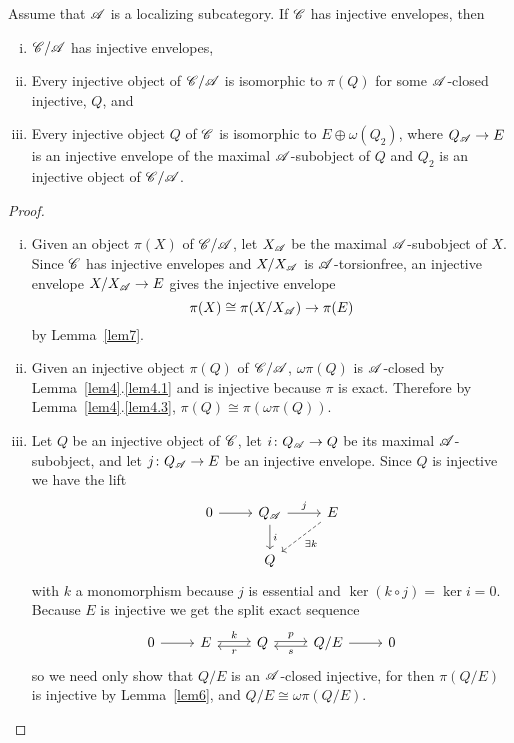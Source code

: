 \documentclass[10pt]{amsart}
\begin{document}
\begin{prop}\label{prop1}
  Assume that $\mathscr{A}$ is a localizing subcategory.
  If $\mathscr{C}$ has injective envelopes, then
  \begin{enumerate}[(i)]
  \item
    $\mathscr{C}/\mathscr{A}$ has injective envelopes,
  \item
    Every injective object of $\mathscr{C}/\mathscr{A}$ is isomorphic to $\pi(Q)$ for some $\mathscr{A}$-closed injective, $Q$, and
  \item
    Every injective object $Q$ of $\mathscr{C}$ is isomorphic to $E \oplus \omega(Q_2)$, where $Q_{\mathscr{A}} \rightarrow E$ is an injective envelope of the maximal $\mathscr{A}$-subobject of $Q$ and $Q_2$ is an injective object of $\mathscr{C}/\mathscr{A}$.
  \end{enumerate}
  
  \begin{proof}
    \begin{enumerate}[(i)]
    \item
      Given an object $\pi(X)$ of $\mathscr{C}/\mathscr{A}$, let $X_{\mathscr{A}}$ be the maximal $\mathscr{A}$-subobject of $X$.
      Since $\mathscr{C}$ has injective envelopes and $X/X_{\mathscr{A}}$ is $\mathscr{A}$-torsionfree, an injective envelope $X/X_{\mathscr{A}} \rightarrow E$ gives the injective envelope
      $$\pi(X) \cong \pi(X/X_{\mathscr{A}}) \rightarrow \pi(E)$$
      by Lemma~\ref{lem7}.
    \item
      Given an injective object $\pi(Q)$ of $\mathscr{C}/\mathscr{A}$, $\omega\pi(Q)$ is $\mathscr{A}$-closed by Lemma~\ref{lem4}.\ref{lem4.1} and is injective because $\pi$ is exact.
      Therefore by Lemma~\ref{lem4}.\ref{lem4.3}, $\pi(Q) \cong \pi(\omega\pi(Q))$.
    \item
      Let $Q$ be an injective object of $\mathscr{C}$, let $i \colon Q_{\mathscr{A}} \rightarrow Q$ be its maximal $\mathscr{A}$-subobject, and let $j \colon Q_{\mathscr{A}} \rightarrow E$ be an injective envelope.
      Since $Q$ is injective we have the lift
      $$\begin{tikzcd}
        0 \arrow{r} & Q_\A \arrow{r}{j} \arrow{d}{i}& E \arrow[dashed]{ld}{\exists k}\\
        & Q
      \end{tikzcd}$$
      with $k$ a monomorphism because $j$ is essential and $\ker{(k \circ j)} = \ker{i} = 0$.
      Because $E$ is injective we get the split exact sequence
      $$\begin{tikzcd}
        0 \arrow{r} & E \arrow[shift left=0.5]{r}{k} & Q \arrow[shift left=0.5]{r}{p}\arrow[shift left=0.5ex]{l}{r} & Q/E \arrow[shift left=0.5ex]{l}{s} \arrow{r} & 0
      \end{tikzcd}$$
      so we need only show that $Q/E$ is an $\mathscr{A}$-closed injective, for then $\pi(Q/E)$ is injective by Lemma~\ref{lem6}, and $Q/E \cong \omega\pi(Q/E)$. 
      

\end{enumerate}
\end{proof}
\end{prop}
\end{document}
